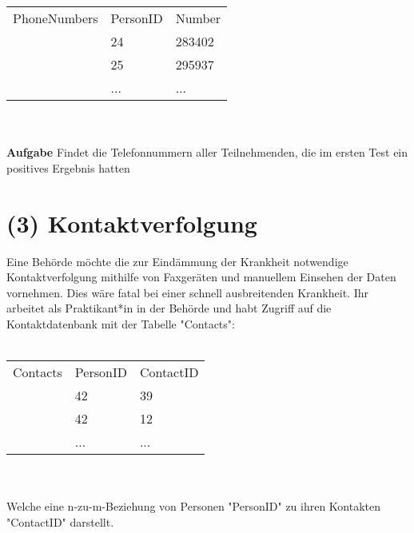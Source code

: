 \documentclass[]{article}
\begin{document}
\begin{tabular}{lll}
\multicolumn{1}{l|}{PhoneNumbers} & \multicolumn{1}{l|}{PersonID} & \multicolumn{1}{l|}{Number} \\ \cline{2-3} 
                                  & 24                            & 283402                      \\
                                  & 25                            & 295937                      \\
                                  & ...                           & ...                        
\end{tabular}\\\ \\

\textbf{Aufgabe} Findet die Telefonnummern aller Teilnehmenden, die im ersten Test ein positives Ergebnis hatten


\newpage

\section*{(3) Kontaktverfolgung}

Eine Behörde möchte die zur Eindämmung der Krankheit notwendige Kontaktverfolgung mithilfe von Faxgeräten und manuellem Einsehen der Daten vornehmen. Dies wäre fatal bei einer schnell ausbreitenden Krankheit. Ihr arbeitet als Praktikant*in in der Behörde und habt Zugriff auf die Kontaktdatenbank mit der Tabelle "Contacts":\\\ \\

\begin{tabular}{lll}
\multicolumn{1}{l|}{Contacts} & \multicolumn{1}{l|}{PersonID} & \multicolumn{1}{l|}{ContactID} \\ \cline{2-3} 
                              & 42                            & 39                             \\
                              & 42                            & 12                             \\
                              & ...                           & ...                           
\end{tabular}\\\ \\

Welche eine n-zu-m-Beziehung von Personen "PersonID" zu ihren Kontakten "ContactID" darstellt.\\\ \\
\end{document}
